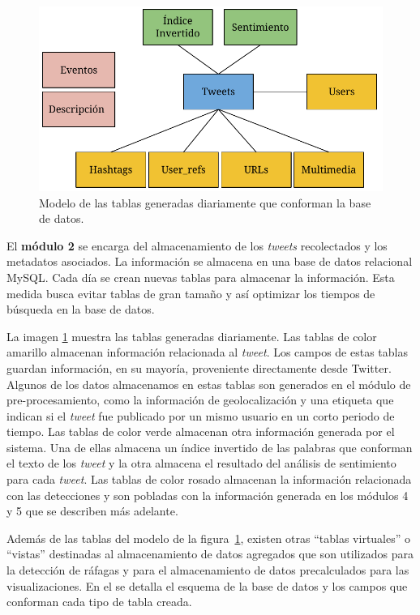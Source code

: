 \begin{figure}[ht]
	\centering
	\includegraphics[width=0.8\linewidth]{imagenes/tweetmodel.pdf}
	\caption{Modelo de las tablas generadas diariamente que conforman la base de datos.}
	\label{img:database}
\end{figure}

El \textbf{módulo 2} se encarga del almacenamiento de los \textit{tweets} recolectados y los metadatos asociados. La información se almacena en una base de datos relacional MySQL. 
%
Cada día se crean nuevas tablas para almacenar la información. Esta medida busca evitar tablas de gran tamaño y así optimizar los tiempos de búsqueda en la base de datos. 


La imagen \ref{img:database} muestra las tablas generadas diariamente. 
%
Las tablas de color amarillo almacenan información relacionada al \textit{tweet}. 
%
Los campos de estas tablas guardan información, en su mayoría, proveniente directamente desde Twitter.
%
Algunos de los datos almacenamos en estas tablas son generados en el módulo de pre-procesamiento, como la información de geolocalización y una etiqueta que indican si el \textit{tweet} fue publicado por un mismo usuario en un corto periodo de tiempo.
%
Las tablas de color verde almacenan otra información generada por el sistema.
%
Una de ellas almacena un índice invertido de las palabras que conforman el texto de los \textit{tweet} y la otra almacena el resultado del análisis de sentimiento para cada \textit{tweet}. 
%
Las tablas de color rosado almacenan la información relacionada con las detecciones y son pobladas con la información generada en los módulos 4 y 5 que se describen más adelante. 


Además de las tablas del modelo de la figura~\ref{img:database}, existen otras ``tablas virtuales'' o ``vistas'' destinadas al almacenamiento de datos agregados que son utilizados para la detección de ráfagas y para el almacenamiento de datos precalculados para las visualizaciones.
%
En el  se detalla el esquema de la base de datos y los campos que conforman cada tipo de tabla creada.


